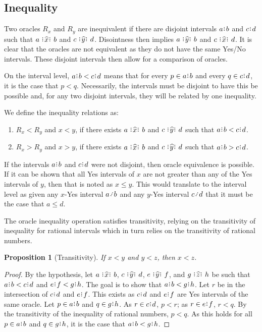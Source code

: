 \documentclass[12pt]{article}
\newtheorem{proposition}{Proposition}[section]
\begin{document}
\subsection{Inequality}

Two oracles $R_x$ and $R_y$ are inequivalent if there are disjoint intervals $a\rint b$ and $c\rint d$ such that $a \xora b$ and $c \xora[y] d$. Disointness then implies \sout{$a \xora[y] b$} and \sout{$c \xora d$}. It is clear that the oracles are not equivalent as they do not have the same Yes/No intervals. These disjoint intervals then allow for a comparison of oracles. 

On the interval level, $a\rint b < c\rint d$ means that for every $p \in a\rint b$ and every $q \in c\rint d$, it is the case that $p < q$. Necessarily, the intervals must be disjoint to have this be possible and, for any two disjoint intervals, they will be related by one inequality. 

We define the inequality relations as: 
\begin{enumerate}
    \item $R_x < R_y$ and $x < y$, if there exists $a \xora b$ and $c \xora[y] d$ such that $a\rint b<c\rint d$.
    \item $R_x > R_y$ and $x > y$, if there exists $a \xora b$ and $c \xora[y] d$ such that $a\rint b > c\rint d$.
\end{enumerate}

If the intervals $a\rint b$ and $c\rint d$ were not disjoint, then oracle equivalence is possible. If it can be shown that all Yes intervals of $x$ are not greater than any of the Yes intervals of $y$, then that is noted as $x \leq y$. This would translate to the interval level as given any $x$-Yes interval $a \lte b$ and any $y$-Yes interval $c \lte d$ that it must be the case that $a \leq d$. 

The oracle inequality operation satisfies transitivity, relying on the transitivity of inequality for rational intervals which in turn relies on the transitivity of rational numbers. 

\begin{proposition}[Transitivity]
    If $x <y$ and $y<z$, then $x < z$.
\end{proposition}

\begin{proof}
    By the hypothesis, let $a \xora b$, $c \xora[y] d$, $e \xora[y] f$, and $g \xora[z] h$ be such that $a\rint b < c\rint d$ and $e\rint f < g\rint h$. The goal is to show that $a\rint b < g\rint h$. Let $r$ be in the intersection of $c\rint d$ and $e\rint f$. This exists as $c\rint d$ and $e\rint f$ are Yes intervals of the same oracle. Let $p \in a\rint b$ and $q \in g\rint h$. As $r \in c\rint d$, $p < r$; as $r \in e\rint f$, $r < q$. By the transitivity of the inequality of rational numbers, $p < q$. As this holds for all $p \in a\rint b$ and $q \in g\rint h$, it is the case that $a\rint b <g\rint h$.
\end{proof}
\end{document}
